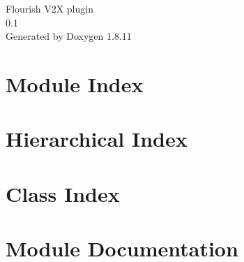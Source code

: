 \documentclass[twoside]{book}
\newcommand{\+}{\discretionary{\mbox{\scriptsize$\hookleftarrow$}}{}{}}
\newcommand{\clearemptydoublepage}{%
  \newpage{\pagestyle{empty}\cleardoublepage}%
}
\begin{document}
\hypersetup{pageanchor=false,
             bookmarksnumbered=true,
             pdfencoding=unicode
            }
\begin{titlepage}
\vspace*{7cm}
\begin{center}%
{\Large Flourish V2X plugin \\[1ex]\large 0.\+1 }\\
\vspace*{1cm}
{\large Generated by Doxygen 1.8.11}\\
\end{center}
\end{titlepage}
\clearemptydoublepage
\tableofcontents
\clearemptydoublepage
{}
\hypersetup{pageanchor=true}

\chapter{Module Index}

\chapter{Hierarchical Index}

\chapter{Class Index}

\chapter{Module Documentation}



\end{document}
